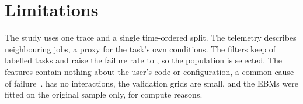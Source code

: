 \section{Limitations}
\label{sec:limitations}

The study uses one trace and a single time-ordered split. The telemetry describes neighbouring jobs, a proxy for the task's own conditions. The filters keep  of labelled tasks and raise the failure rate to , so the population is selected. The features contain nothing about the user's code or configuration, a common cause of failure~\cite{jeon2019philly}. \kaam{} has no interactions, the validation grids are small, and the EBMs were fitted on the original sample only, for compute reasons.
